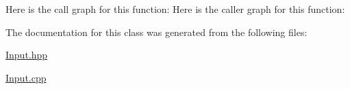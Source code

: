 Here is the call graph for this function\+:
Here is the caller graph for this function\+:


The documentation for this class was generated from the following files\+:\begin{DoxyCompactItemize}
\item 
\mbox{\hyperlink{_input_8hpp}{Input.\+hpp}}\item 
\mbox{\hyperlink{_input_8cpp}{Input.\+cpp}}\end{DoxyCompactItemize}
